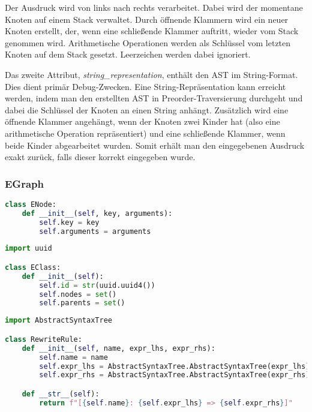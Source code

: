 Der Ausdruck wird von links nach rechts verarbeitet. Dabei wird der momentane Knoten auf einem Stack verwaltet.
Durch öffnende Klammern wird ein neuer Knoten erstellt, der, wenn eine schließende Klammer auftritt, wieder vom Stack genommen wird.
Arithmetische Operationen werden als Schlüssel vom letzten Knoten auf dem Stack gesetzt.
Leerzeichen werden dabei ignoriert.

Das zweite Attribut, \textit{string\_representation}, enthält den AST im String-Format. Dies dient primär Debug-Zwecken.
Eine String-Repräsentation kann erreicht werden, indem man den erstellten AST in Preorder-Traversierung durchgeht und dabei die Schlüssel der Knoten an einen String anhängt.
Zusätzlich wird eine öffnende Klammer angehängt, wenn der Knoten zwei Kinder hat (also eine arithmetische Operation repräsentiert) und eine schließende Klammer,
wenn beide Kinder abgearbeitet wurden. Somit erhält man den eingegebenen Ausdruck exakt zurück, falls dieser korrekt eingegeben wurde.

\subsubsection{EGraph}

\begin{lstlisting}[language=Python, caption=Klasse \textit{ENode}]
class ENode:
    def __init__(self, key, arguments):
        self.key = key
        self.arguments = arguments
\end{lstlisting}

\begin{lstlisting}[language=Python, caption=Klasse \textit{EClass}]
import uuid

class EClass:
    def __init__(self):
        self.id = str(uuid.uuid4())
        self.nodes = set()
        self.parents = set()
\end{lstlisting}

\begin{lstlisting}[language=Python, caption=Klasse \textit{RewriteRule}]
import AbstractSyntaxTree

class RewriteRule:
    def __init__(self, name, expr_lhs, expr_rhs):
        self.name = name
        self.expr_lhs = AbstractSyntaxTree.AbstractSyntaxTree(expr_lhs)
        self.expr_rhs = AbstractSyntaxTree.AbstractSyntaxTree(expr_rhs)

    def __str__(self):
        return f"[{self.name}: {self.expr_lhs} => {self.expr_rhs}]"
\end{lstlisting}

